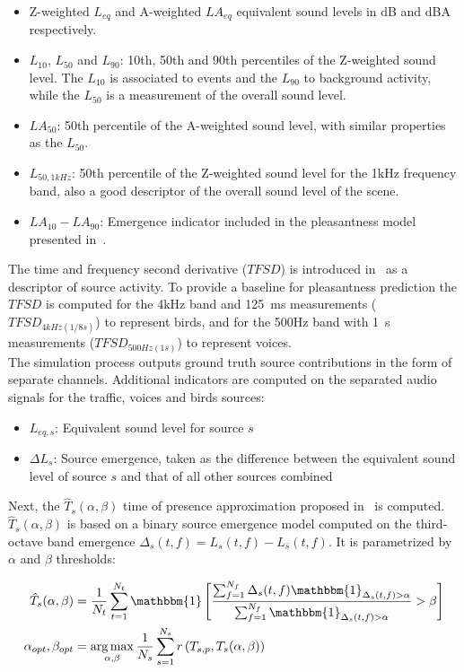 \documentclass[11pt,a4paper]{article}
\DeclareMathOperator*{\argmax}{arg\,max}
\begin{document}
\begin{itemize}
\item Z-weighted $L_{eq}$ and A-weighted $LA_{eq}$ equivalent sound levels in dB and dBA respectively.
\item $L_{10}$, $L_{50}$ and $L_{90}$: 10th, 50th and 90th percentiles of the Z-weighted sound level. The $L_{10}$ is associated to events and the $L_{90}$ to background activity, while the $L_{50}$ is a measurement of the overall sound level.
\item $LA_{50}$: 50th percentile of the A-weighted sound level, with similar properties as the $L_{50}$.
\item $L_{50, 1kHz}$: 50th percentile of the Z-weighted sound level for the 1kHz frequency band, also a good descriptor of the overall sound level of the scene.
\item $LA_{10}-LA_{90}$: Emergence indicator included in the pleasantness model presented in~\cite{ricciardi2014}.
\end{itemize}

The time and frequency second derivative ($TFSD$) is introduced in~\cite{aumond2017} as a descriptor of source activity. To provide a baseline for pleasantness prediction the $TFSD$ is computed for the 4kHz band and 125~ms measurements ($TFSD_{4kHz(1/8s)}$) to represent birds, and for the 500Hz band with 1~s measurements ($TFSD_{500Hz(1s)}$) to represent voices.\\

The simulation process outputs ground truth source contributions in the form of separate channels. Additional indicators are computed on the separated audio signals for the traffic, voices and birds sources:

\begin{itemize}
\item $L_{eq, s}$: Equivalent sound level for source $s$
\item $\Delta L_{s}$: Source emergence, taken as the difference between the equivalent sound level of source $s$ and that of all other sources combined
\end{itemize}

Next, the $\hat T_s(\alpha, \beta)$ time of presence approximation proposed in~\cite{gontier2018} is computed. $\hat T_s(\alpha, \beta)$ is based on a binary source emergence model computed on the third-octave band emergence $\Delta_s(t, f) = L_s(t, f) - L_{\bar{s}}(t, f)$. It is parametrized by $\alpha$ and $\beta$ thresholds:

\begin{align}
\hat T_s(\alpha, \beta) &= \frac{1}{N_t}\sum_{t = 1}^{N_t}\mathbbm{1}\left[ \frac{\sum_{f = 1}^{N_f}\Delta_s(t, f)\mathbbm{1}_{\Delta_s(t, f)>\alpha}}{\sum_{f = 1}^{N_f}\mathbbm{1}_{\Delta_s(t, f)>\alpha}}>\beta \right]\\
\alpha_{opt},\beta_{opt} &= \argmax_{\alpha, \beta}\frac{1}{N_s}\sum_{s = 1}^{N_s}r\left(T_{s, p}, T_s(\alpha, \beta)\right)
\end{align}
\end{document}
